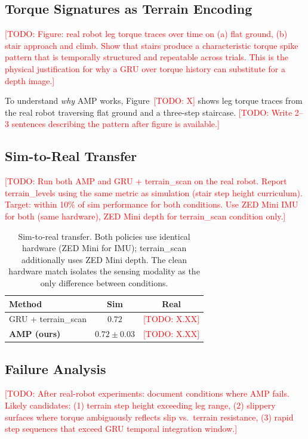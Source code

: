 \documentclass{article}
\newcommand{\todo}[1]{\textcolor{red}{[TODO: #1]}}
\begin{document}
\subsection{Torque Signatures as Terrain Encoding}
\label{sec:torque_signatures}

\todo{Figure: real robot leg torque traces over time on (a) flat ground, (b) stair
approach and climb. Show that stairs produce a characteristic torque spike pattern that
is temporally structured and repeatable across trials. This is the physical justification
for why a GRU over torque history can substitute for a depth image.}

To understand \emph{why} AMP works, Figure~\todo{X} shows leg torque traces from the
real robot traversing flat ground and a three-step staircase. \todo{Write 2--3 sentences
describing the pattern after figure is available.}

\subsection{Sim-to-Real Transfer}
\label{sec:sim2real}

\todo{Run both AMP and GRU + terrain\_scan on the real robot. Report terrain\_levels
using the same metric as simulation (stair step height curriculum). Target: within 10\%
of sim performance for both conditions. Use ZED Mini IMU for both (same hardware),
ZED Mini depth for terrain\_scan condition only.}

\begin{table}[h]
\centering
\begin{tabular}{lcc}
\toprule
Method & Sim & Real \\
\midrule
GRU + terrain\_scan & $0.72$ & \todo{X.XX} \\
\textbf{AMP (ours)}  & $0.72 \pm 0.03$ & \todo{X.XX} \\
\bottomrule
\end{tabular}
\caption{Sim-to-real transfer. Both policies use identical hardware (ZED Mini for IMU);
terrain\_scan additionally uses ZED Mini depth. The clean hardware match isolates the
sensing modality as the only difference between conditions.}
\label{tab:sim2real}
\end{table}

\subsection{Failure Analysis}
\label{sec:failure}

\todo{After real-robot experiments: document conditions where AMP fails. Likely candidates:
(1) terrain step height exceeding leg range, (2) slippery surfaces where torque ambiguously
reflects slip vs.\ terrain resistance, (3) rapid step sequences that exceed GRU temporal
integration window.}
\end{document}
